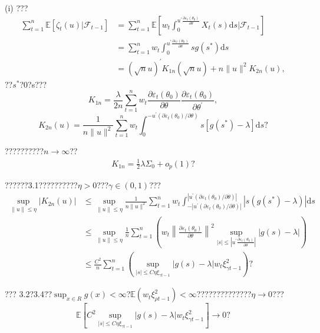 \documentclass[a4paper,12pt,openany,oneside,utf-8]{ctexbook}
\begin{document}
	\noindent (i) ???
	\begin{align}\label{322}
		\sum_{t=1}^n\mathbb{E}[\zeta_t(u)|\mathcal{F}_{t-1}]&=\sum_{t=1}^n\mathbb{E}\left[w_t\int_0^{u^{\prime}\frac{\partial\varepsilon_t(\theta_0)}{\partial\theta}}X_t(s)\mathrm{d}s\Big|\mathcal{F}_{t-1}\right] \nonumber\\
		&=\sum_{t=1}^nw_t\int_0^{u^{\prime}\frac{\partial\varepsilon_t(\theta_0)}{\partial\theta}}sg(s^{*})\mathrm{d}s \nonumber\\
		&=(\sqrt{n} u)^{\prime} K_{1 n}(\sqrt{n} u)+n\|u\|^{2} K_{2 n}(u),
	\end{align}
	??$s^{*}$?0?s???$$K_{1 n}=\frac{\lambda}{2n} \sum_{t=1}^{n} w_{t} \frac{\partial \varepsilon_{t}\left(\theta_{0}\right)}{\partial \theta} \frac{\partial \varepsilon_{t}\left(\theta_{0}\right)}{\partial \theta^{\prime}},$$ $$K_{2 n}(u)=\frac{1}{n\|u\|^{2}} \sum_{t=1}^{n} w_{t} \int_{0}^{-u^{\prime}\left(\partial \varepsilon_{t}\left(\theta_{0}\right) / \partial \theta\right)} s\left[g\left(s^{*}\right)-\lambda\right]\mathrm{d}s\mbox{?}$$
	
	\noindent ??????????$n \rightarrow \infty$??
	\begin{align}\label{323}
		K_{1 n}=\frac{1}{2}\lambda\Sigma_{0}+o_{p}(1)\mbox{?}
	\end{align}
	
	\noindent ??????3.1??????????$\eta>0$???$\gamma\in(0,1)$???
	\begin{align}
		\sup _{\|u\| \leq \eta}\left|K_{2 n}(u)\right|
		&\le\sup _{\|u\| \leq \eta} \frac{1}{n\|u\|^{2}} \sum_{t=1}^{n} w_{t} \int_{-\left|u^{\prime}\left(\partial \varepsilon_{t}\left(\theta_{0}\right) / \partial \theta\right)\right|}^{\left|u^{\prime}\left(\partial \varepsilon_{t}\left(\theta_{0}\right) / \partial \theta\right)\right|}\left|s\left(g\left(s^{*}\right)-\lambda\right)\right|\mathrm{d}s \nonumber\\
		& \le  \sup _{\|u\| \leq \eta}\frac{1}{n} \sum_{t=1}^{n}\left(w_{t}\left\|\frac{\partial \varepsilon_{t}\left(\theta_{0}\right) }{\partial \theta}\right\|^2\sup _{|s| \le \left|u^{\prime}\frac{\partial \varepsilon_{t}\left(\theta_{0}\right) }{\partial \theta}\right|}\left|g(s)-\lambda\right|\right)\nonumber\\
		&\le \frac{C^2}{n} \sum_{t=1}^{n}\left(\sup _{|s| \leq C \eta \xi_{\gamma t-1}}|g(s)-\lambda| w_{t} \xi_{\gamma t-1}^{2}\right)\mbox{?}\nonumber
	\end{align}
	
	\noindent ??? 3.2?3.4??$\sup _{x \in R} g(x)<\infty$?$\mathbb{E}\left(w_{t} \xi_{\rho t-1}^{2}\right)<\infty$??????????????$\eta\rightarrow 0$???
	$$\mathbb{E}\left[C^2\sup _{|s| \leq C \eta \xi_{\gamma t-1}}|g(s)-\lambda| w_{t} \xi_{\gamma t-1}^{2}\right] \rightarrow 0\mbox{?}$$
	
\end{document}
